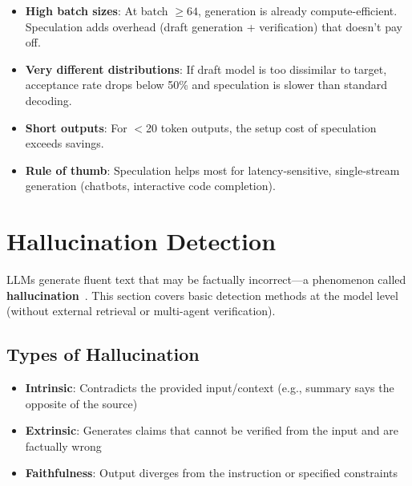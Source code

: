 \begin{warningbox}
\begin{itemize}
  \item \textbf{High batch sizes}: At batch $\geq 64$, generation is already compute-efficient. Speculation adds overhead (draft generation + verification) that doesn’t pay off.
  \item \textbf{Very different distributions}: If draft model is too dissimilar to target, acceptance rate drops below 50\% and speculation is slower than standard decoding.
  \item \textbf{Short outputs}: For $<$20 token outputs, the setup cost of speculation exceeds savings.
  \item \textbf{Rule of thumb}: Speculation helps most for latency-sensitive, single-stream generation (chatbots, interactive code completion).
\end{itemize}
\end{warningbox}

\newpage
\section{Hallucination Detection}
\label{sec:hallucination}

LLMs generate fluent text that may be factually incorrect---a phenomenon called \textbf{hallucination}~\cite{ji2023hallucination}. This section covers basic detection methods at the model level (without external retrieval or multi-agent verification).

\subsection{Types of Hallucination}
\label{types-of-hallucination}

\begin{keybox}
\begin{itemize}
  \item \textbf{Intrinsic}: Contradicts the provided input/context (e.g., summary says the opposite of the source)
  \item \textbf{Extrinsic}: Generates claims that cannot be verified from the input and are factually wrong
  \item \textbf{Faithfulness}: Output diverges from the instruction or specified constraints
\end{itemize}
\end{keybox}

